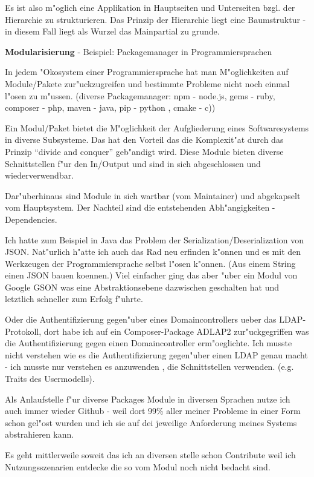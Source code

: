 Es ist also m"oglich eine Applikation in Hauptseiten und Unterseiten bzgl. der Hierarchie zu strukturieren.
Das Prinzip der Hierarchie liegt eine Baumstruktur - in diesem Fall liegt als Wurzel das Mainpartial zu grunde.

\newpage
\textbf{Modularisierung}
- Beispiel: Packagemanager in Programmiersprachen

In jedem "Okosystem einer Programmiersprache hat man M"oglichkeiten auf Module/Pakete zur"uckzugreifen und bestimmte Probleme nicht noch einmal l"osen zu m"ussen. (diverse Packagemanager: npm - node.js, gems - ruby, composer - php, maven - java, pip - python , cmake - c))

Ein Modul/Paket bietet die M"oglichkeit der Aufgliederung eines Softwaresystems in diverse Subsysteme. Das hat den Vorteil das die Komplexit"at durch das Prinzip ``divide and conquer'' geb"andigt wird.
Diese Module bieten diverse Schnittstellen f"ur den In/Output und sind in sich abgeschlossen und wiederverwendbar.

Dar"uberhinaus sind Module in sich wartbar (vom Maintainer) und abgekapselt vom Hauptsystem. Der Nachteil sind die entstehenden Abh"angigkeiten - Dependencies.

Ich hatte zum Beispiel in Java das Problem der Serialization/Deserialization von JSON.
Nat"urlich h"atte ich auch das Rad neu erfinden k"onnen und es mit den Werkzeugen der Programmiersprache selbst l"osen k"onnen. (Aus einem String einen JSON bauen koennen.)
Viel einfacher ging das aber "uber ein Modul von Google GSON was eine Abstraktionsebene dazwischen geschalten hat und letztlich schneller zum Erfolg f"uhrte.

Oder die Authentifizierung gegen"uber eines Domaincontrollers ueber das LDAP-Protokoll, dort habe ich auf ein Composer-Package ADLAP2 zur"uckgegriffen was die Authentifizierung gegen einen Domaincontroller erm"oeglichte. Ich musste nicht verstehen wie es die Authentifizierung gegen"uber einen LDAP genau macht - ich musste nur verstehen es anzuwenden , die Schnittstellen verwenden. (e.g. Traits des Usermodells).

Als Anlaufstelle f"ur diverse Packages Module in diversen Sprachen nutze ich auch immer wieder Github - weil dort 99\% aller meiner Probleme in einer Form schon gel"ost wurden und ich sie auf dei jeweilige Anforderung meines Systems abstrahieren kann.

Es geht mittlerweile soweit das ich an diversen stelle schon Contribute weil ich Nutzungsszenarien entdecke die so vom Modul noch nicht bedacht sind.

